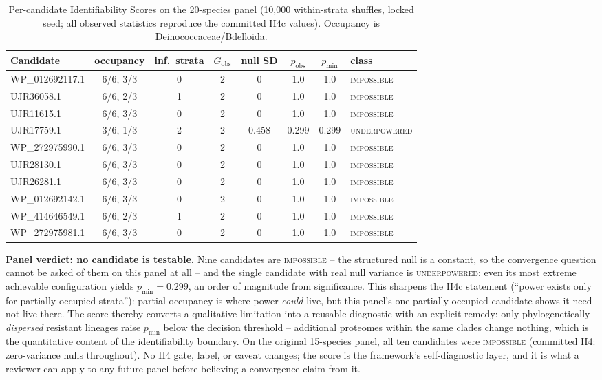 \documentclass[12pt,a4paper]{article}
\begin{document}
\begin{table}[ht]\centering\scriptsize\setlength{\tabcolsep}{3.5pt}
\caption{Per-candidate Identifiability Scores on the 20-species panel (10{,}000 within-strata shuffles, locked seed; all observed statistics reproduce the committed H4c values). Occupancy is Deinococcaceae/Bdelloida.}
\label{tab:identifiability}
\begin{tabular}{lccccccl}
\hline
Candidate & occupancy & inf.\ strata & $G_{\mathrm{obs}}$ & null SD & $p_{\mathrm{obs}}$ & $p_{\min}$ & class \\
\hline
WP\_012692117.1 & 6/6, 3/3 & 0 & 2 & 0 & 1.0 & 1.0 & \textsc{impossible} \\
UJR36058.1 & 6/6, 2/3 & 1 & 2 & 0 & 1.0 & 1.0 & \textsc{impossible} \\
UJR11615.1 & 6/6, 3/3 & 0 & 2 & 0 & 1.0 & 1.0 & \textsc{impossible} \\
UJR17759.1 & 3/6, 1/3 & 2 & 2 & 0.458 & 0.299 & 0.299 & \textsc{underpowered} \\
WP\_272975990.1 & 6/6, 3/3 & 0 & 2 & 0 & 1.0 & 1.0 & \textsc{impossible} \\
UJR28130.1 & 6/6, 3/3 & 0 & 2 & 0 & 1.0 & 1.0 & \textsc{impossible} \\
UJR26281.1 & 6/6, 3/3 & 0 & 2 & 0 & 1.0 & 1.0 & \textsc{impossible} \\
WP\_012692142.1 & 6/6, 3/3 & 0 & 2 & 0 & 1.0 & 1.0 & \textsc{impossible} \\
WP\_414646549.1 & 6/6, 2/3 & 1 & 2 & 0 & 1.0 & 1.0 & \textsc{impossible} \\
WP\_272975981.1 & 6/6, 3/3 & 0 & 2 & 0 & 1.0 & 1.0 & \textsc{impossible} \\
\hline
\end{tabular}
\end{table}

\textbf{Panel verdict: no candidate is testable.} Nine candidates are \textsc{impossible} -- the structured null is a constant, so the convergence question cannot be asked of them on this panel at all -- and the single candidate with real null variance is \textsc{underpowered}: even its most extreme achievable configuration yields $p_{\min} = 0.299$, an order of magnitude from significance. This sharpens the H4c statement (``power exists only for partially occupied strata''): partial occupancy is where power \emph{could} live, but this panel's one partially occupied candidate shows it need not live there. The score thereby converts a qualitative limitation into a reusable diagnostic with an explicit remedy: only phylogenetically \emph{dispersed} resistant lineages raise $p_{\min}$ below the decision threshold -- additional proteomes within the same clades change nothing, which is the quantitative content of the identifiability boundary. On the original 15-species panel, all ten candidates were \textsc{impossible} (committed H4: zero-variance nulls throughout). No H4 gate, label, or caveat changes; the score is the framework's self-diagnostic layer, and it is what a reviewer can apply to any future panel before believing a convergence claim from it.
\end{document}
